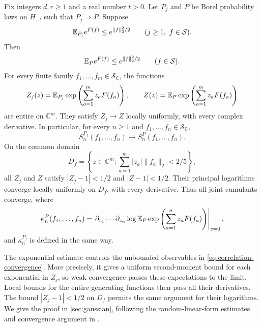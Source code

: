 \documentclass[11pt,letterpaper,reqno]{amsart}
\begin{document}
\begin{theorem}
\label{thm:gaussian-convergence}
Fix integers $d,r\ge1$ and a real number $t>0$. Let $P_j$ and $P$ be Borel probability
laws on $H_{-t}$ such that $P_j\Longrightarrow P$. Suppose
\begin{equation}\label{eq:sequence-gaussian}
 \mathbb E_{P_j}e^{F(f)}\le e^{\|f\|_2^2/2}
 \qquad(j\ge1,\ f\in\mathcal S).
\end{equation}
Then
\begin{equation}\label{eq:limit-continuum-G}
 \mathbb E_P e^{F(f)}\le e^{\|f\|_2^2/2}
 \qquad(f\in\mathcal S).
\end{equation}
For every finite family $f_1,\ldots,f_m\in\mathcal S_{\mathbb C}$,
the functions
\[
 Z_j(z)=\mathbb E_{P_j}\exp\left(\sum_{a=1}^m z_aF(f_a)\right),
 \qquad
 Z(z)=\mathbb E_P\exp\left(\sum_{a=1}^m z_aF(f_a)\right)
\]
are entire on $\mathbb C^m$. They satisfy $Z_j\to Z$ locally
uniformly, with every complex derivative. In particular, for
every $n\ge1$ and $f_1,\ldots,f_n\in\mathcal S_{\mathbb C}$,
\begin{equation}\label{eq:correlation-convergence}
 S_n^{P_j}(f_1,\ldots,f_n)\longrightarrow
 S_n^P(f_1,\ldots,f_n).
\end{equation}
On the common domain
\begin{equation}\label{eq:zero-free-domain}
 D_f=\left\{z\in\mathbb C^m:
                 \sum_{a=1}^m|z_a|\|f_a\|_2<2/5\right\},
\end{equation}
all $Z_j$ and $Z$ satisfy $|Z_j-1|<1/2$ and $|Z-1|<1/2$.
Their principal logarithms converge locally uniformly on $D_f$,
with every derivative. Thus all joint cumulants converge, where
\[
 \kappa_n^P(f_1,\ldots,f_n)
 =\left.\partial_{z_1}\cdots\partial_{z_n}
       \log\mathbb E_P\exp\left(\sum_{a=1}^n z_aF(f_a)\right)
   \right|_{z=0},
\]
and $\kappa_n^{P_j}$ is defined in the same way.
\end{theorem}

The exponential estimate controls the unbounded observables in
\eqref{eq:correlation-convergence}. More precisely, it gives
a uniform second-moment bound for each exponential in $Z_j$,
so weak convergence passes these expectations to the limit.
Local bounds for the entire generating functions then pass all
their derivatives. The bound $|Z_j-1|<1/2$ on
$D_f$ permits the same argument for their
logarithms. We give the proof in \cref{sec:gaussian}, following
the random-linear-form estimates and convergence argument in
\cite[Sections~5.1--5.2 and~6.2]{QED3Manuscript}.
\end{document}
